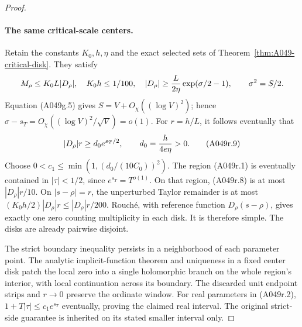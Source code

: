 \begin{proof}
\paragraph{The same critical-scale centers.}
Retain the constants $K_0,h,\eta$ and the exact selected sets of
Theorem~\ref{thm:A049-critical-disk}. They satisfy
\[
 M_\rho\le K_0L|D_\rho|,\quad K_0h\le1/100,\quad
 |D_\rho|\ge {L\over2\eta}\exp(\sigma/2-1),
 \qquad \sigma^2=S/2.
\]
Equation (A049g.5) gives
$S=V+O_\chi((\log V)^2)$; hence
$\sigma-s_T=O_\chi((\log V)^2/\sqrt V)=o(1)$.
For $r=h/L$, it follows eventually that
\[
        |D_\rho|r\ge d_0 e^{s_T/2},
                     \qquad d_0={h\over4e\eta}>0.
\tag{A049r.9}
\]
Choose $0<c_1\le\min(1,(d_0/(10C_0))^2)$.
The region (A049r.1) is eventually contained in $|\tau|<1/2$,
since $e^{s_T}=T^{o(1)}$. On that region, (A049r.8) is at
most $|D_\rho|r/10$. On $|s-\rho|=r$, the unperturbed Taylor
remainder is at most
$(K_0h/2)|D_\rho|r\le|D_\rho|r/200$.
Rouch\'e, with reference function $D_\rho(s-\rho)$, gives
exactly one zero counting multiplicity in each disk.
It is therefore simple. The disks are already pairwise disjoint.

The strict boundary inequality persists in a neighborhood of each
parameter point. The analytic implicit-function theorem and
uniqueness in a fixed center disk patch the local zero into a
single holomorphic branch on the whole region's interior, with
local continuation across its boundary. The discarded unit endpoint
strips and $r\to0$ preserve the ordinate window. For real parameters
in (A049r.2), $1+T|\tau|\le c_1e^{s_T}$ eventually, proving
the claimed real interval. The original strict-side guarantee is
inherited on its stated smaller interval only.


\end{proof}
